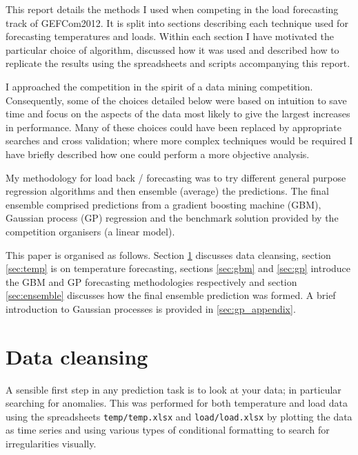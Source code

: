 \documentclass[final,authoryear,1p,times]{elsarticle}
\begin{document}
This report details the methods I used when competing in the load forecasting track of GEFCom2012\footnotemark.
It is split into sections describing each technique used for forecasting temperatures and loads.
Within each section I have motivated the particular choice of algorithm, discussed how it was used and described how to replicate the results using the spreadsheets and scripts accompanying this report\footnotemark.


I approached the competition in the spirit of a data mining competition.
Consequently, some of the choices detailed below were based on intuition to save time and focus on the aspects of the data most likely to give the largest increases in performance.
Many of these choices could have been replaced by appropriate searches and cross validation; where more complex techniques would be required I have briefly described how one could perform a more objective analysis.

My methodology for load back / forecasting was to try different general purpose regression algorithms and then ensemble (average) the predictions.
The final ensemble comprised predictions from a gradient boosting machine (GBM), Gaussian process (GP) regression and the benchmark solution provided by the competition organisers (a linear model).

This paper is organised as follows.
Section \ref{sec:cleans} discusses data cleansing, section \ref{sec:temp} is on temperature forecasting, sections \ref{sec:gbm} and \ref{sec:gp} introduce the GBM and GP forecasting methodologies respectively and section \ref{sec:ensemble} discusses how the final ensemble prediction was formed.
A brief introduction to Gaussian processes is provided in \ref{sec:gp_appendix}.

\section{Data cleansing}

\label{sec:cleans}

A sensible first step in any prediction task is to look at your data; in particular searching for anomalies.
This was performed for both temperature and load data using the spreadsheets \texttt{temp/temp.xlsx} and \texttt{load/load.xlsx} by plotting the data as time series and using various types of conditional formatting to search for irregularities visually.
\end{document}
